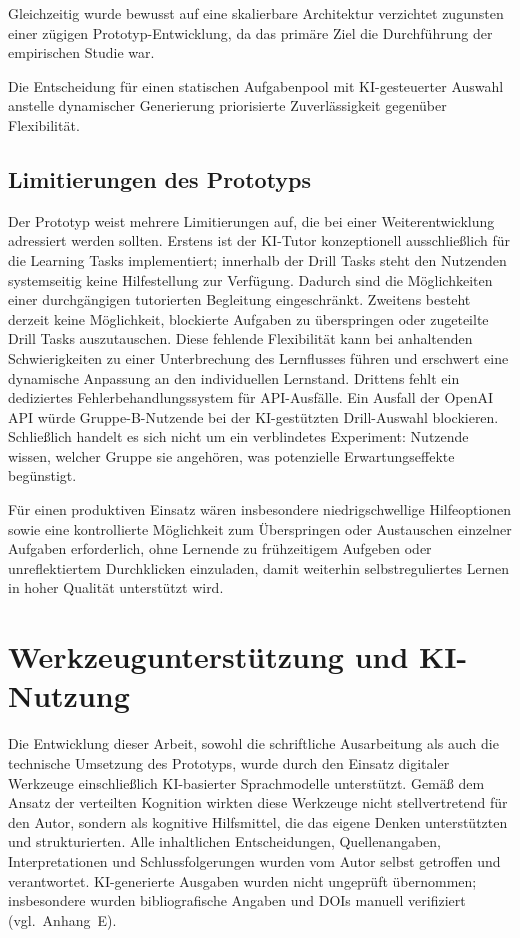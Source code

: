 Gleichzeitig wurde bewusst auf eine skalierbare Architektur verzichtet zugunsten einer zügigen Prototyp-Entwicklung, da das primäre Ziel die Durchführung der empirischen Studie war.

Die Entscheidung für einen statischen Aufgabenpool mit KI-gesteuerter Auswahl anstelle dynamischer Generierung priorisierte Zuverlässigkeit gegenüber Flexibilität.

\subsection{Limitierungen des Prototyps}

Der Prototyp weist mehrere Limitierungen auf, die bei einer Weiterentwicklung adressiert werden sollten.
Erstens ist der KI-Tutor konzeptionell ausschließlich für die Learning Tasks implementiert; innerhalb der Drill Tasks steht den Nutzenden systemseitig keine Hilfestellung zur Verfügung. Dadurch sind die Möglichkeiten einer durchgängigen tutorierten Begleitung eingeschränkt.
Zweitens besteht derzeit keine Möglichkeit, blockierte Aufgaben zu überspringen oder zugeteilte Drill Tasks auszutauschen. Diese fehlende Flexibilität kann bei anhaltenden Schwierigkeiten zu einer Unterbrechung des Lernflusses führen und erschwert eine dynamische Anpassung an den individuellen Lernstand.
Drittens fehlt ein dediziertes Fehlerbehandlungssystem für API-Ausfälle. Ein Ausfall der OpenAI API würde Gruppe-B-Nutzende bei der KI-gestützten Drill-Auswahl blockieren.
Schließlich handelt es sich nicht um ein verblindetes Experiment: Nutzende wissen, welcher Gruppe sie angehören, was potenzielle Erwartungseffekte begünstigt.

Für einen produktiven Einsatz wären insbesondere niedrigschwellige Hilfeoptionen sowie eine kontrollierte Möglichkeit zum Überspringen oder Austauschen einzelner Aufgaben erforderlich, ohne Lernende zu frühzeitigem Aufgeben oder unreflektiertem Durchklicken einzuladen, damit weiterhin selbstreguliertes Lernen in hoher Qualität unterstützt wird.


\section{Werkzeugunterstützung und KI-Nutzung}\label{sec:werkzeuge}

Die Entwicklung dieser Arbeit, sowohl die schriftliche Ausarbeitung als auch die technische Umsetzung des Prototyps, wurde durch den Einsatz digitaler Werkzeuge einschließlich KI-basierter Sprachmodelle unterstützt.
Gemäß dem Ansatz der verteilten Kognition wirkten diese Werkzeuge nicht stellvertretend für den Autor, sondern als kognitive Hilfsmittel, die das eigene Denken unterstützten und strukturierten.
Alle inhaltlichen Entscheidungen, Quellenangaben, Interpretationen und Schlussfolgerungen wurden vom Autor selbst getroffen und verantwortet.
KI-generierte Ausgaben wurden nicht ungeprüft übernommen; insbesondere wurden bibliografische Angaben und DOIs manuell verifiziert (vgl.\ Anhang~E).

